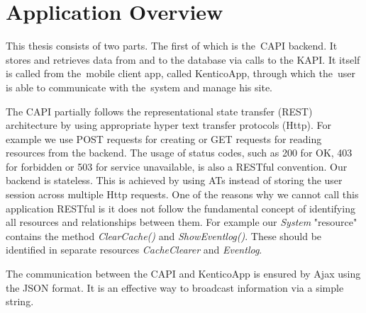 \section{Application Overview}
This thesis consists of two parts. The first of which is the~CAPI backend. It stores and retrieves data from and to the database via calls to the KAPI. It itself is called from the~mobile client app, called KenticoApp, through which the~user is able to communicate with the~system and manage his site.

The CAPI partially follows the representational state transfer (REST) architecture by using appropriate hyper text transfer protocols (Http). For example we use POST requests for creating or GET requests for reading resources from the backend. The usage of status codes, such as 200 for OK, 403 for forbidden or 503 for service unavailable, is also a RESTful convention. Our backend is stateless. This is achieved by using ATs instead of storing the user session across multiple Http requests. One of the reasons why we cannot call this application RESTful is it does not follow the fundamental concept of identifying all resources and relationships between them. For example our \textit{System} "resource" contains the method \textit{ClearCache()} and \textit{ShowEventlog()}. These should be identified in separate resources \textit{CacheClearer} and \textit{Eventlog}.

The communication between the CAPI and KenticoApp is ensured by Ajax using the JSON format. It is an effective way to broadcast information via a simple string.

